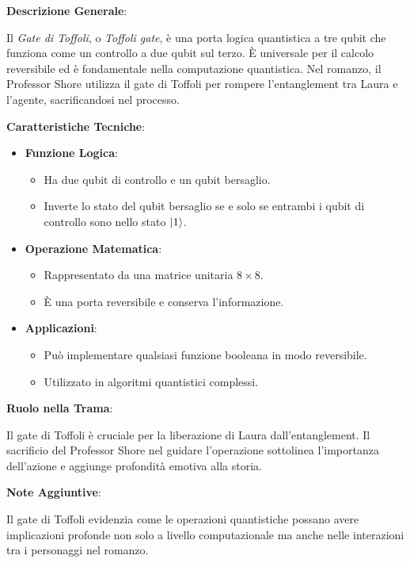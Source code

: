 \vspace{0.5cm}

\begin{tcolorbox}[colback=white,colframe=black,title=\textbf{Gate di Toffoli}]
\begin{multicols}{2}
\textbf{Descrizione Generale}:

Il \emph{Gate di Toffoli}, o \emph{Toffoli gate}, è una porta logica quantistica a tre qubit che funziona come un controllo a due qubit sul terzo. È universale per il calcolo reversibile ed è fondamentale nella computazione quantistica. Nel romanzo, il Professor Shore utilizza il gate di Toffoli per rompere l'entanglement tra Laura e l'agente, sacrificandosi nel processo.

\textbf{Caratteristiche Tecniche}:

\begin{itemize}
    \item \textbf{Funzione Logica}:
    \begin{itemize}
        \item Ha due qubit di controllo e un qubit bersaglio.
        \item Inverte lo stato del qubit bersaglio se e solo se entrambi i qubit di controllo sono nello stato $\ket{1}$.
    \end{itemize}
    \item \textbf{Operazione Matematica}:
    \begin{itemize}
        \item Rappresentato da una matrice unitaria $8 \times 8$.
        \item È una porta reversibile e conserva l'informazione.
    \end{itemize}
    \item \textbf{Applicazioni}:
    \begin{itemize}
        \item Può implementare qualsiasi funzione booleana in modo reversibile.
        \item Utilizzato in algoritmi quantistici complessi.
    \end{itemize}
\end{itemize}

\textbf{Ruolo nella Trama}:

Il gate di Toffoli è cruciale per la liberazione di Laura dall'entanglement. Il sacrificio del Professor Shore nel guidare l'operazione sottolinea l'importanza dell'azione e aggiunge profondità emotiva alla storia.

\textbf{Note Aggiuntive}:

Il gate di Toffoli evidenzia come le operazioni quantistiche possano avere implicazioni profonde non solo a livello computazionale ma anche nelle interazioni tra i personaggi nel romanzo.

\end{multicols}
\end{tcolorbox}

